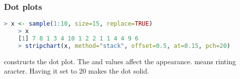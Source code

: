 \documentclass[../Notes.tex]{subfiles}
\begin{document}
    \subsubsection{Dot plots}
\begin{lstlisting}[language=R]
    > x <- sample(1:10, size=15, replace=TRUE)
    > x
    [1] 7 8 1 3 4 10 1 2 2 1 1 4 4 9 6
    > stripchart(x, method="stack", offset=0.5, at=0.15, pch=20)
\end{lstlisting}

     constructs the dot plot. The  and  values affect the appearance.  means rinting aracter. Having it set to 20 makes the dot solid.

    \begin{center}
    \end{center}
\end{document}

